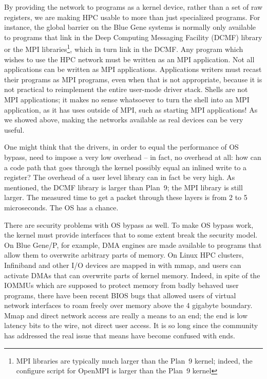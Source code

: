 \documentclass[letterpaper,twocolumn,10pt]{article}
\begin{document}
By providing the network to programs as a kernel device, rather than a set of raw registers, we are making HPC usable 
to more than just specialized programs. For instance, the global barrier on the Blue Gene systems is normally only 
available to programs that link in the Deep Computing Messaging Facility (DCMF) library or the 
MPI libraries\footnote{MPI libraries are typically much larger than the Plan~9 kernel; indeed, the configure script for OpenMPI is larger than the Plan~9 kernel}, which in turn 
link in the DCMF. Any program which wishes to use the HPC network must be written as an MPI 
application. Not all applications can be written as MPI applications. Applications writers must recast their 
programs as MPI programs, even when that is not appropriate, because it is not practical 
to reimplement the entire user-mode driver stack. 
Shells are not MPI applications; it makes
no sense whatsoever to turn the shell into an MPI application, as it has uses outside of MPI, such 
as starting MPI applications! As we showed above, making the networks available as real devices can be very useful. 

One might think that the  drivers, in order to equal the performance of OS bypass, need to impose a very 
low overhead -- in fact, no overhead at all: how can a code path that goes through the kernel possibly equal an
inlined write to a register? The overhead of a user level library can in fact be very high. As mentioned, the DCMF library is larger than Plan~9; the 
MPI library is still larger. The measured time to get a packet through these layers is from 2 to 5 microseconds. The OS has a chance. 


There are security problems with OS bypass as well. 
To make OS bypass work, the kernel must provide interfaces that to some extent break the security model. On Blue Gene/P, for 
example, DMA engines  are made available to programs  that allow them to overwrite arbitrary parts of memory. On Linux HPC clusters, 
Infiniband and other I/O devices are mapped in with mmap, and users can activate DMAs that can overwrite parts of kernel memory. Indeed, 
in spite of the IOMMUs which are supposed to protect memory from badly behaved user programs, 
there have been recent BIOS bugs that allowed users of virtual network interfaces to roam freely over memory above the 4 gigabyte
boundary\cite{iommubug}. Mmap and direct network access are  really  a 
means to an end; the end is low latency bits to the wire, not direct user access. It is so long 
since the community has addressed the real issue that means have become confused with ends. 
\end{document}
